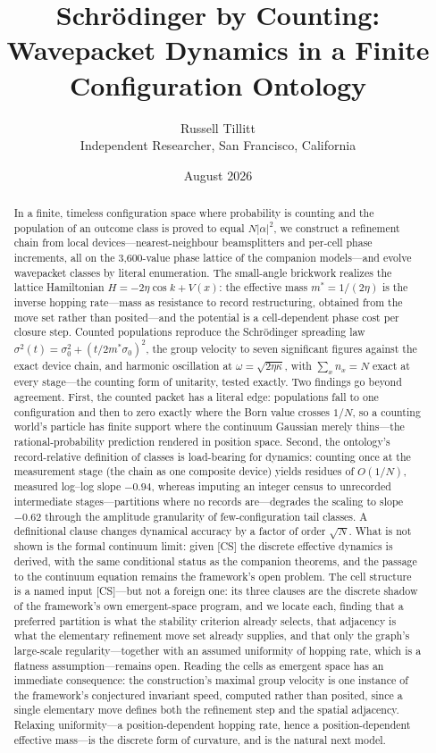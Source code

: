 \documentclass[11pt]{article}
\title{Schr\"odinger by Counting:\\ Wavepacket Dynamics in a Finite Configuration Ontology}
\author{Russell Tillitt\\ \small Independent Researcher, San Francisco, California}
\date{August 2026}
\theoremstyle{definition}
\theoremstyle{remark}
\begin{document}
\maketitle

\begin{abstract}
In a finite, timeless configuration space where probability is counting and the population of an outcome class is proved to equal $N|\alpha|^2$, we construct a refinement chain from local devices---nearest-neighbour beamsplitters and per-cell phase increments, all on the 3,600-value phase lattice of the companion models---and evolve wavepacket classes by literal enumeration. The small-angle brickwork realizes the lattice Hamiltonian $H = -2\eta\cos k + V(x)$: the effective mass $m^\ast = 1/(2\eta)$ is the inverse hopping rate---mass as resistance to record restructuring, obtained from the move set rather than posited---and the potential is a cell-dependent phase cost per closure step. Counted populations reproduce the Schr\"odinger spreading law $\sigma^2(t) = \sigma_0^2 + (t/2m^\ast\sigma_0)^2$, the group velocity to seven significant figures against the exact device chain, and harmonic oscillation at $\omega = \sqrt{2\eta\kappa}$, with $\sum_x n_x = N$ exact at every stage---the counting form of unitarity, tested exactly. Two findings go beyond agreement. First, the counted packet has a literal edge: populations fall to one configuration and then to zero exactly where the Born value crosses $1/N$, so a counting world's particle has finite support where the continuum Gaussian merely thins---the rational-probability prediction rendered in position space. Second, the ontology's record-relative definition of classes is load-bearing for dynamics: counting once at the measurement stage (the chain as one composite device) yields residues of $O(1/N)$, measured log--log slope $-0.94$, whereas imputing an integer census to unrecorded intermediate stages---partitions where no records are---degrades the scaling to slope $-0.62$ through the amplitude granularity of few-configuration tail classes. A definitional clause changes dynamical accuracy by a factor of order $\sqrt{N}$. What is not shown is the formal continuum limit: given [CS] the discrete effective dynamics is derived, with the same conditional status as the companion theorems, and the passage to the continuum equation remains the framework's open problem. The cell structure is a named input [CS]---but not a foreign one: its three clauses are the discrete shadow of the framework's own emergent-space program, and we locate each, finding that a preferred partition is what the stability criterion already selects, that adjacency is what the elementary refinement move set already supplies, and that only the graph's large-scale regularity---together with an assumed uniformity of hopping rate, which is a flatness assumption---remains open. Reading the cells as emergent space has an immediate consequence: the construction's maximal group velocity is one instance of the framework's conjectured invariant speed, computed rather than posited, since a single elementary move defines both the refinement step and the spatial adjacency. Relaxing uniformity---a position-dependent hopping rate, hence a position-dependent effective mass---is the discrete form of curvature, and is the natural next model.

\end{abstract}
\end{document}
